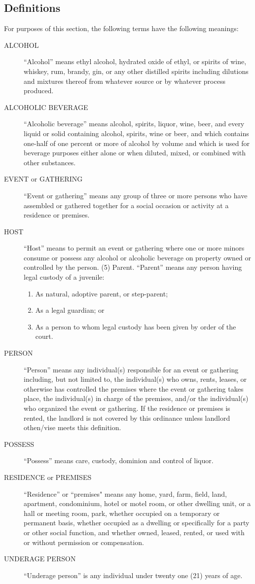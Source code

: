 \subsection{Definitions}
For purposes of this section, the following terms have the following meanings:
\begin{description}
    \item[ALCOHOL] “Alcohol” means ethyl alcohol, hydrated oxide of ethyl, or spirits of wine, whiskey, rum, brandy, gin, or any other distilled spirits including dilutions and mixtures thereof from whatever source or by whatever process produced.
    \item[ALCOHOLIC BEVERAGE] “Alcoholic beverage” means alcohol, spirits, liquor, wine, beer, and every liquid or solid containing alcohol, spirits, wine or beer, and which contains one-half of one percent or more of alcohol by volume and which is used for beverage purposes either alone or when diluted, mixed, or combined with other substances.
    \item[EVENT or GATHERING] “Event or gathering” means any group of three or more persons who have assembled or gathered together for a social occasion or activity at a residence or premises.
    \item[HOST] “Host” means to permit an event or gathering where one or more minors consume or possess any alcohol or alcoholic beverage on property owned or controlled by the person. (5) Parent. “Parent” means any person having legal custody of a juvenile:
        \begin{enumerate}[{\indent}a)]
            \item As natural, adoptive parent, or step-parent;
            \item As a legal guardian; or
            \item As a person to whom legal custody has been given by order of the court.
        \end{enumerate}
    \item[PERSON] “Person” means any individual(s) responsible for an event or gathering including, but not limited to, the individual(s) who owns, rents, leases, or otherwise has controlled the premises where the event or gathering takes place, the individual(s) in charge of the premises, and/or the individual(s) who organized the event or gathering. If the residence or premises is rented, the landlord is not covered by this ordinance unless landlord othen/vise meets this definition.
    \item[POSSESS] “Possess” means care, custody, dominion and control of liquor.
    \item[RESIDENCE or PREMISES] “Residence” or “premises" means any home, yard, farm, field, land, apartment, condominium, hotel or motel room, or other dwelling unit, or a hall or meeting room, park, whether occupied on a temporary or permanent basis, whether occupied as a dwelling or specifically for a party or other social function, and whether owned, leased, rented, or used with or without permission or compensation.
    \item[UNDERAGE PERSON] “Underage person” is any individual under twenty one (21) years of age.
\end{description}
